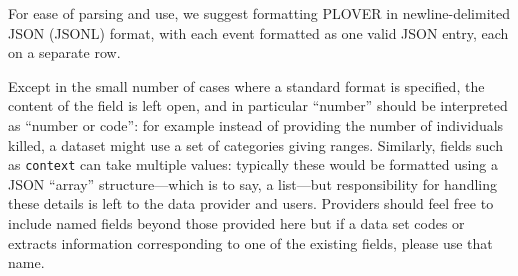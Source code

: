 \documentclass[11pt]{report}
\begin{document}
\noindent For ease of parsing and use, we suggest formatting PLOVER in newline-delimited JSON (JSONL) format, with each event formatted as one valid JSON entry, each on a separate row.

Except in the small number of cases where a standard format is specified, the content of the field is left open, and in particular ``number'' should be interpreted as ``number or code'': for example instead of providing the number of individuals killed, a dataset might use a set of categories giving ranges. Similarly, fields such as \texttt{context} can take multiple values: typically these would be formatted using a JSON ``array'' structure---which is to say, a list---but responsibility for handling these details is left to the data provider and users.  Providers should feel free to include named fields beyond those provided here but if a data set codes or extracts information  corresponding to one of the existing fields, please use that name.




\newpage 
\end{document}
